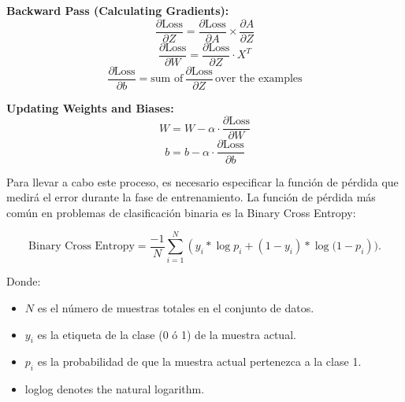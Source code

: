 \documentclass{uathesis-es}
\begin{document}
\textbf{Backward Pass (Calculating Gradients):}
\[ \frac{\partial \text{Loss}}{\partial Z} = \frac{\partial \text{Loss}}{\partial A} \times \frac{\partial A}{\partial Z} \]
\[ \frac{\partial \text{Loss}}{\partial W} = \frac{\partial \text{Loss}}{\partial Z} \cdot X^T \]
\[ \frac{\partial \text{Loss}}{\partial b} = \text{sum of} \, \frac{\partial \text{Loss}}{\partial Z} \, \text{over the examples} \]

\textbf{Updating Weights and Biases:}
\[ W = W - \alpha \cdot \frac{\partial \text{Loss}}{\partial W} \]
\[ b = b - \alpha \cdot \frac{\partial \text{Loss}}{\partial b} \]

Para llevar a cabo este proceso, es necesario especificar la función de pérdida que medirá el error durante la fase de entrenamiento. La función de pérdida más común en problemas de clasificación binaria es la Binary Cross Entropy:

$$\text{Binary Cross Entropy} = \frac{-1}{N} \sum_{i=1}^{N} (y_{i}*\log{p_{i}}+ (1 - y_{i})*\log{(1-p_{i}})).$$

Donde:

\begin{itemize}
    \item $N$ es el número de muestras totales en el conjunto de datos.
    \item $y_i$ es la etiqueta de la clase (0 ó 1) de la muestra actual.
    \item $p_i$ es la probabilidad de que la muestra actual pertenezca a la clase 1.
    \item log⁡log denotes the natural logarithm.
\end{itemize}
\end{document}

